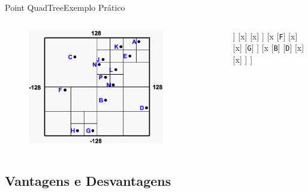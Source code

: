 \documentclass[red, tikz, aspectratio=169, xcolor=dvipsnames]{beamer}
\begin{document}
			
			\begin{frame}[fragile]{Point QuadTree}{Exemplo Prático}
				\centering
				\vspace{-40px}
				\begin{columns}
					\begin{column}{0.4\textwidth}
						\begin{figure}
							\centering
							\includegraphics[width=0.8\textwidth]{img/pr-quad.png}
						\end{figure}
					\end{column}
					\begin{column}{0.55\textwidth}
						\centering
						\fbox{
							\begin{forest}
								[\texttt{(x,y)}
								[NO]
								[NE]
								[SO]
								[SE]
								]
						\end{forest}}
						
						\begin{forest}
							[x
							[\texttt{C}
							]
							[x
							[x]
							[x
							[x]
							[\texttt{A}]
							[\texttt{E}]
							[x]
							]
							[x]
							[x]
							]
							[x
								[\texttt{F}]
								[x]
								[x]
								[\texttt{G}]
							]
							[x
							[\texttt{B}]
							[\texttt{D}]
							[x]
							[x]
							]
							]
						\end{forest}
						
					\end{column}
				\end{columns}
			\end{frame}


	\subsection{Vantagens e Desvantagens}
	
\end{document}
